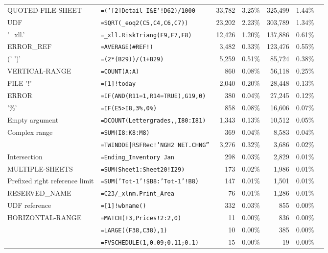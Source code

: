 \documentclass[conference]{IEEEtran}
\begin{document}
\begin{table*}
\begin{tabular}{llrrrrr}
		QUOTED-FILE-SHEET & \texttt{=('[2]Detail I\&E'!D62)/1000}  & 33,782 & 3.25\% & 325,499 & 1.44\%\\
		UDF & \texttt{=SQRT(_eoq2(C5,C4,C6,C7))}  & 23,202 & 2.23\% & 303,789 & 1.34\%\\
		'_xll.' & \texttt{=_xll.RiskTriang(F9,F7,F8)}  & 12,426 & 1.20\% & 137,886 & 0.61\%\\
		ERROR_REF & \texttt{=AVERAGE(\#REF!)}  & 3,482 & 0.33\% & 123,476 & 0.55\%\\
		(' \synt{Reference} ')' & \texttt{=(2*(B29))/(1+B29)}  & 5,259 & 0.51\% & 85,724 & 0.38\%\\
		VERTICAL-RANGE & \texttt{=COUNT(A:A)}  & 860 & 0.08\% & 56,118 & 0.25\%\\
		FILE '!' & \texttt{=[1]!today}  & 2,040 & 0.20\% & 28,448 & 0.13\%\\
		ERROR & \texttt{=IF(AND(R11=1,R14=TRUE),G19,0)}  & 380 & 0.04\% & 27,245 & 0.12\%\\
		'\%' & \texttt{=IF(E5>I8,3\%,0\%)}  & 858 & 0.08\% & 16,606 & 0.07\%\\
			Empty argument & \texttt{=DCOUNT(Lettergrades,,I80:I81)}  & 1,343 & 0.13\% & 10,512 & 0.05\%\\
			Complex range & \texttt{=SUM(I8:K8:M8)}  & 369 & 0.04\% & 8,583 & 0.04\%\\
			\synt{DynamicDataExchange} & \texttt{=TWINDDE|RSFRec!'NGH2 NET.CHNG''}  & 3,276 & 0.32\% & 3,686 & 0.02\%\\
			Intersection & \texttt{=Ending_Inventory Jan}  & 298 & 0.03\% & 2,829 & 0.01\%\\
			MULTIPLE-SHEETS & \texttt{=SUM(Sheet1:Sheet20!I29)}  & 173 & 0.02\% & 1,986 & 0.01\%\\
			Prefixed right reference limit & \texttt{=SUM('Tot-1'!\$B8:'Tot-1'!B8)}  & 147 & 0.01\% & 1,501 & 0.01\%\\
			RESERVED_NAME & \texttt{=C23/_xlnm.Print_Area}  & 76 & 0.01\% & 1,286 & 0.01\%\\
			UDF reference & \texttt{=[1]!wbname()}  & 332 & 0.03\% & 855 & 0.00\%\\
			HORIZONTAL-RANGE & \texttt{=MATCH(F3,Prices!2:2,0)}  & 11 & 0.00\% & 836 & 0.00\%\\
			\synt{Union} & \texttt{=LARGE((F38,C38),1)}  & 10 & 0.00\% & 385 & 0.00\%\\
			\synt{ConstantArray} & \texttt{=FVSCHEDULE(1,{0.09;0.11;0.1})}  & 15 & 0.00\% & 19 & 0.00\%\\
			\hline
	\end{tabular}
\end{table*}
\end{document}

